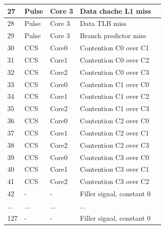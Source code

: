 \begin{table}[H]
\begin{footnotesize}
\begin{tabular}{|l|l|l|l|l|}
\hline 
27 & Pulse & Core 3 &  Data chache L1 miss \\
\hline 
28 & Pulse & Core 3 &  Data TLB miss \\
\hline 
29 & Pulse & Core 3 &  Branch predictor miss \\
\hline 
30 & CCS & Core0 &  Contention C0 over C1\\
\hline 
31 & CCS & Core1 &  Contention C0 over C2\\
\hline 
32 & CCS & Core2 &  Contention C0 over C3\\
\hline 
33 & CCS & Core0 &  Contention C1 over C0\\
\hline 
34 & CCS & Core1 &  Contention C1 over C2\\
\hline 
35 & CCS & Core2 &  Contention C1 over C3\\
\hline 
36 & CCS & Core0 &  Contention C2 over C0\\
\hline 
37 & CCS & Core1 &  Contention C2 over C1\\
\hline 
38 & CCS & Core2 &  Contention C2 over C3\\
\hline 
39 & CCS & Core0 &  Contention C3 over C0\\
\hline 
40 & CCS & Core1 &  Contention C3 over C1\\
\hline 
41 & CCS & Core2 &  Contention C3 over C2\\
\hline 
42 & - & - &   Filler signal, constant 0 \\
\hline 
... & ... & ... &  ... \\

\hline 
127 & - & - &   Filler signal, constant 0 \\
\hline 
	\end{tabular}
	\end{footnotesize}
\end{table}

